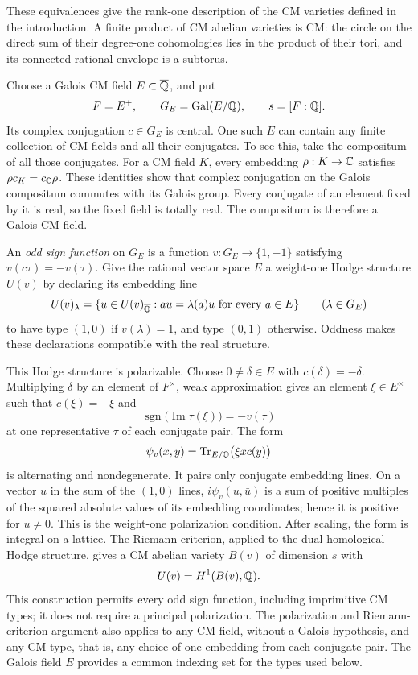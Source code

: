 These equivalences give the rank-one description of the CM varieties
defined in the introduction.
A finite product of CM abelian varieties is CM: the circle on the
direct sum of their degree-one cohomologies lies in the product of
their tori, and its connected rational envelope is a subtorus.

Choose a Galois CM field \(E\subset\overline{\mathbb{Q}}\), and put
\[
 F=E^+,\qquad G_E=\operatorname{Gal}(E/\mathbb{Q}),\qquad s=[F:\mathbb{Q}].
\]
Its complex conjugation \(c\in G_E\) is central.  One such \(E\) can
contain any finite collection of CM fields and all their conjugates.
To see this, take the compositum of all those conjugates.  For a CM
field \(K\), every embedding \(\rho:K\to\mathbb{C}\) satisfies
\(\rho c_K=c_{\mathbb{C}}\rho\).  These identities show that complex
conjugation on the Galois compositum commutes with its Galois group.
Every conjugate of an element fixed by it is real, so the fixed field
is totally real.  The compositum is therefore a Galois CM field.

An \emph{odd sign function} on \(G_E\) is a function
\(v:G_E\to\{1,-1\}\) satisfying \(v(c\tau)=-v(\tau)\).  Give the
rational vector space \(E\) a weight-one Hodge structure \(U(v)\) by
declaring its embedding line
\[
 U(v)_\lambda=
 \{u\in U(v)_{\overline{\mathbb{Q}}}: au=\lambda(a)u\text{ for every }a\in E\}
 \qquad(\lambda\in G_E)
\]
to have type \((1,0)\) if \(v(\lambda)=1\), and type \((0,1)\)
otherwise.  Oddness makes these declarations compatible with the real
structure.

This Hodge structure is polarizable.  Choose \(0\ne\delta\in E\) with
\(c(\delta)=-\delta\).  Multiplying \(\delta\) by an element of
\(F^\times\), weak approximation gives an element \(\xi\in E^\times\)
such that \(c(\xi)=-\xi\) and
\[
 \operatorname{sgn}\bigl(\operatorname{Im}\tau(\xi)\bigr)=-v(\tau)
\]
at one representative \(\tau\) of each conjugate pair.  The form
\[
 \psi_v(x,y)=\operatorname{Tr}_{E/\mathbb{Q}}\bigl(\xi x c(y)\bigr)
\]
is alternating and nondegenerate.  It pairs only conjugate embedding
lines.  On a vector \(u\) in the sum of the \((1,0)\) lines,
\(i\psi_v(u,\bar u)\) is a sum of positive multiples of the squared
absolute values of its embedding coordinates; hence it is positive
for \(u\ne0\).  This is the weight-one polarization condition.
After scaling, the form is integral on a lattice.  The Riemann
criterion, applied to the dual homological Hodge structure, gives a
CM abelian variety \(B(v)\) of dimension \(s\) with
\begin{equation}\label{eq:cm-types}
 U(v)=H^1(B(v),\mathbb{Q}).
\end{equation}
This construction permits every odd sign function, including
imprimitive CM types; it does not require a principal polarization.
The polarization and Riemann-criterion argument also applies to any
CM field, without a Galois hypothesis, and any CM type, that is, any
choice of one embedding from each conjugate pair.  The Galois field
\(E\) provides a common indexing set for the types used below.

